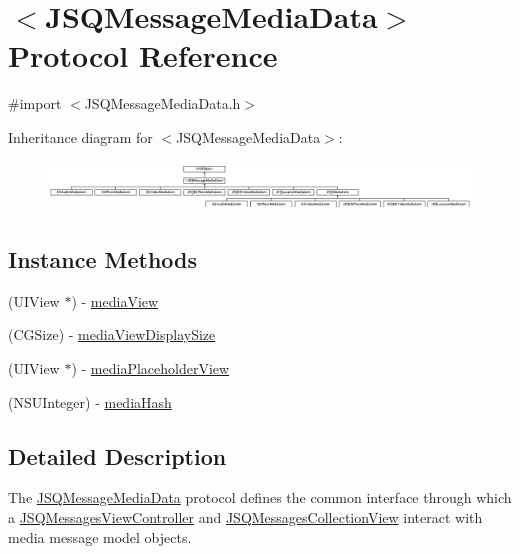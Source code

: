\hypertarget{protocol_j_s_q_message_media_data-p}{}\section{$<$J\+S\+Q\+Message\+Media\+Data$>$ Protocol Reference}
\label{protocol_j_s_q_message_media_data-p}


{\ttfamily \#import $<$J\+S\+Q\+Message\+Media\+Data.\+h$>$}

Inheritance diagram for $<$J\+S\+Q\+Message\+Media\+Data$>$\+:\begin{figure}[H]
\begin{center}
\leavevmode
\includegraphics[height=1.309942cm]{protocol_j_s_q_message_media_data-p}
\end{center}
\end{figure}
\subsection*{Instance Methods}
\begin{DoxyCompactItemize}
\item 
(U\+I\+View $\ast$) -\/ \hyperlink{protocol_j_s_q_message_media_data-p_a9b9c8d5c88a45112c345248da58169f4}{media\+View}
\item 
(C\+G\+Size) -\/ \hyperlink{protocol_j_s_q_message_media_data-p_ae1b1ff9bfecc2a4a02eabf4da793b94d}{media\+View\+Display\+Size}
\item 
(U\+I\+View $\ast$) -\/ \hyperlink{protocol_j_s_q_message_media_data-p_a5436746b19645862254924e1fa4ad21e}{media\+Placeholder\+View}
\item 
(N\+S\+U\+Integer) -\/ \hyperlink{protocol_j_s_q_message_media_data-p_abc76463a45e3d010e05799a24a3c0076}{media\+Hash}
\end{DoxyCompactItemize}


\subsection{Detailed Description}
The {\ttfamily \hyperlink{protocol_j_s_q_message_media_data-p}{J\+S\+Q\+Message\+Media\+Data}} protocol defines the common interface through which a {\ttfamily \hyperlink{interface_j_s_q_messages_view_controller}{J\+S\+Q\+Messages\+View\+Controller}} and {\ttfamily \hyperlink{interface_j_s_q_messages_collection_view}{J\+S\+Q\+Messages\+Collection\+View}} interact with media message model objects.

